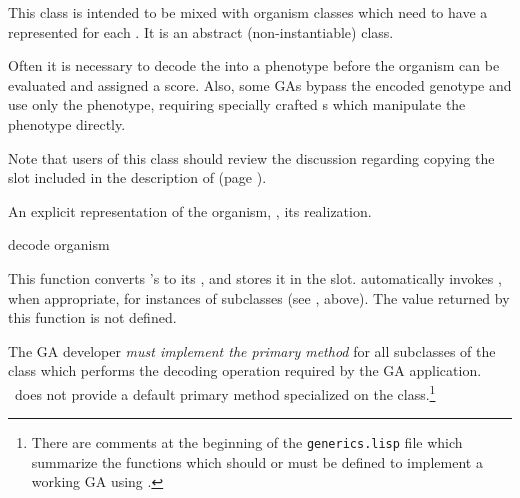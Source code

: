 {\filbreak
{\samepage
{} \label{class:organism-phenotype-mixin}

This class is intended to be mixed with organism classes which need to have a
 represented for each . It is an
abstract (non-instantiable) class.
\par}%

\filbreak
Often it is necessary to decode the  into a phenotype before the
organism can be evaluated and assigned a score. Also, some GAs bypass the encoded
genotype and use only the phenotype, requiring specially crafted s which
manipulate the phenotype directly.

\filbreak
Note that users of this class should review the discussion regarding copying the
 slot included in the description of
 (page \pageref{copy-organism:organism}).

\gap
  
\filbreak
{\samepage



  An explicit representation of the organism, \ie, its realization.
\par}%

\gap

\filbreak
{\samepage


\Defgeneric decode {organism}

This function converts 's  to its ,
and stores it in the  slot. \Geco{} automatically invokes
, when appropriate, for instances of
 subclasses (see , above).
The value returned by this function is not defined.
\par}%

\filbreak
The GA developer {\em must implement the primary method} for all subclasses of the
class  which performs the decoding operation
required by the GA application. \Geco\ does not provide a default primary method
specialized on the  class.\footnote{There are comments
at the beginning of the {\tt generics.lisp} file which summarize the functions which
should or must be defined to implement a working GA using \geco.}

}
